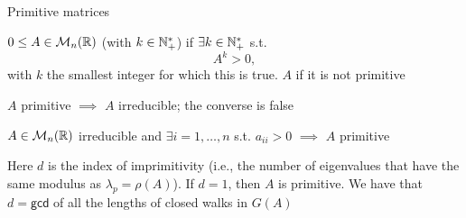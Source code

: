 \documentclass[aspectratio=169]{beamer}\usepackage[]{graphicx}\usepackage[]{xcolor}
\begin{document}
\begin{frame}{Primitive matrices}
\begin{definition}
$0\leq A\in\mathcal{M}_n(\mathbb{R})$  (with  $k\in \mathbb{N}_{+}^{*}$) if $\exists k\in \mathbb{N}_{+}^{*}$ s.t.
\[
A^k>0,
\]
with $k$ the smallest integer for which this is true.
$A$  if it is not primitive
\end{definition}
\vfill
$A$ primitive $\implies$ $A$ irreducible; the converse is false
\end{frame}

\begin{frame}
\begin{theorem}
	$A\in\mathcal{M}_n(\mathbb{R})$ irreducible and $\exists i=1,\ldots,n$ s.t. $a_{ii}>0$ $\implies$ $A$ primitive
\end{theorem}
\vfill
Here $d$ is the index of imprimitivity (i.e., the number of eigenvalues that have the same modulus as $\lambda_p=\rho(A)$). If $d=1$, then $A$ is primitive. We have that $d=\mathsf{gcd}$ of all the lengths of closed walks in $G(A)$
\end{frame}
\end{document}
